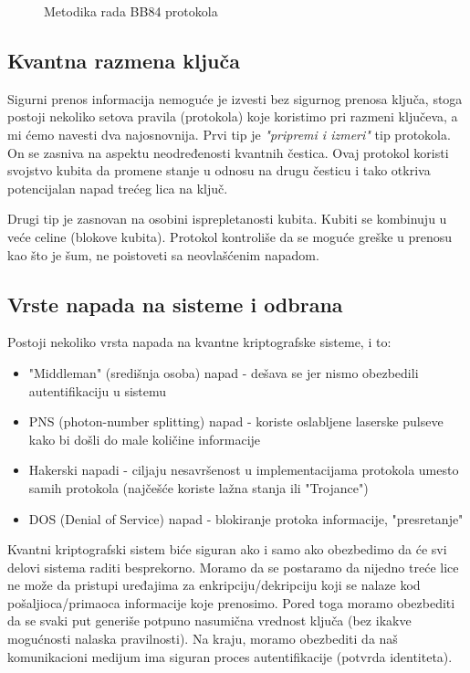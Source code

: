 \documentclass[a4paper]{article}
\begin{document}
{\begin{figure}[h]
\caption{Metodika rada BB84 protokola}
\label{slike:prva}
\end{figure}
\subsection{Kvantna razmena ključa}
Sigurni prenos informacija nemoguće je izvesti bez sigurnog prenosa ključa, stoga postoji nekoliko setova pravila (protokola) koje koristimo pri razmeni ključeva, a mi ćemo navesti dva najosnovnija.\newpage
Prvi tip je \emph{"pripremi i izmeri"} tip protokola. On se zasniva na aspektu neodređenosti kvantnih čestica. Ovaj protokol koristi svojstvo kubita da promene stanje u odnosu na drugu česticu i tako otkriva potencijalan napad trećeg lica na ključ.

Drugi tip je zasnovan na osobini isprepletanosti kubita. Kubiti se kombinuju u veće celine (blokove kubita). Protokol kontroliše da se moguće greške u prenosu kao što je šum, ne poistoveti sa neovlašćenim napadom.
\smallskip
\subsection{Vrste napada na sisteme i odbrana}
Postoji nekoliko vrsta napada na kvantne kriptografske sisteme, i to:
\begin{itemize}
\item "Middleman" (središnja osoba) napad - dešava se jer nismo obezbedili autentifikaciju u sistemu
\item PNS (photon-number splitting) napad - koriste oslabljene laserske pulseve kako bi došli do male količine informacije
\item Hakerski napadi - ciljaju nesavršenost u implementacijama
protokola umesto samih protokola (najčešće koriste lažna stanja ili "Trojance")
\item DOS (Denial of Service) napad - blokiranje protoka informacije, "presretanje"
\end{itemize}
Kvantni kriptografski sistem biće siguran ako i samo ako obezbedimo da će svi delovi sistema raditi besprekorno. Moramo da se postaramo da nijedno treće lice ne može da pristupi uređajima za enkripciju/dekripciju koji se nalaze kod pošaljioca/primaoca informacije koje prenosimo. Pored toga moramo obezbediti da se svaki put generiše potpuno nasumična vrednost ključa (bez ikakve mogućnosti nalaska pravilnosti).  Na kraju, moramo obezbediti da naš komunikacioni medijum ima siguran proces autentifikacije (potvrda identiteta).

}
\end{document}

